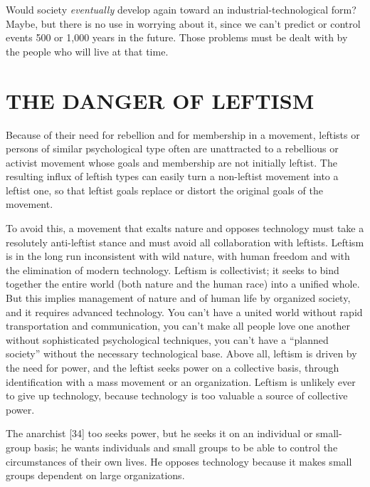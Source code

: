  Would society {\em eventually} develop again toward an industrial-technological form? Maybe, but there is no use in worrying about it, since we can’t predict or control events 500 or 1,000 years in the future. Those problems must be dealt with by the people who will live at that time.

\chapter{THE DANGER OF LEFTISM}

 Because of their need for rebellion and for membership in a movement, leftists or persons of similar psychological type often are unattracted to a rebellious or activist movement whose goals and membership are not initially leftist. The resulting influx of leftish types can easily turn a non-leftist movement into a leftist one, so that leftist goals replace or distort the original goals of the movement.

 To avoid this, a movement that exalts nature and opposes technology must take a resolutely anti-leftist stance and must avoid all collaboration with leftists. Leftism is in the long run inconsistent with wild nature, with human freedom and with the elimination of modern technology. Leftism is collectivist; it seeks to bind together the entire world (both nature and the human race) into a unified whole. But this implies management of nature and of human life by organized society, and it requires advanced technology. You can’t have a united world without rapid transportation and communication, you can’t make all people love one another without sophisticated psychological techniques, you can’t have a “planned society” without the necessary technological base. Above all, leftism is driven by the need for power, and the leftist seeks power on a collective basis, through identification with a mass movement or an organization. Leftism is unlikely ever to give up technology, because technology is too valuable a source of collective power.

 The anarchist [34] too seeks power, but he seeks it on an individual or small-group basis; he wants individuals and small groups to be able to control the circumstances of their own lives. He opposes technology because it makes small groups dependent on large organizations.

